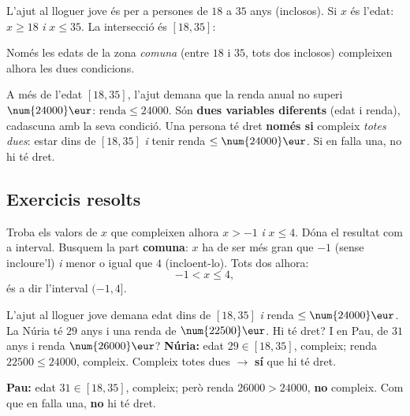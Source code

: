 \begin{exemple}
L'ajut al lloguer jove és per a persones de $18$ a $35$ anys (inclosos). Si $x$ és
l'edat: $x\ge 18$ \emph{i} $x\le 35$. La intersecció és $[18,35]$:

\begin{center}
\end{center}

\noindent Només les edats de la zona \emph{comuna} (entre $18$ i $35$, tots dos
inclosos) compleixen alhora les dues condicions.
\end{exemple}

\begin{exemple}
A més de l'edat $[18,35]$, l'ajut demana que la renda anual no superi $\num{24000}\eur$:
$\text{renda}\le\num{24000}$. Són \textbf{dues variables diferents} (edat i renda),
cadascuna amb la seva condició. Una persona té dret \textbf{només si} compleix
\emph{totes dues}: estar dins de $[18,35]$ \emph{i} tenir renda $\le\num{24000}\eur$.
Si en falla una, no hi té dret.
\end{exemple}

\subsection{Exercicis resolts}

\begin{exresolt}
Troba els valors de $x$ que compleixen alhora $x>-1$ \emph{i} $x\le 4$. Dóna el
resultat com a interval.
\solucio
Busquem la part \textbf{comuna}: $x$ ha de ser més gran que $-1$ (sense incloure'l)
\emph{i} menor o igual que $4$ (incloent-lo). Tots dos alhora:
\[
-1<x\le 4,
\]
és a dir l'interval $(-1,4]$.
\resposta{$(-1,4]$.}
\end{exresolt}

\begin{exresolt}
L'ajut al lloguer jove demana edat dins de $[18,35]$ \emph{i} renda $\le\num{24000}\eur$.
La Núria té $29$ anys i una renda de $\num{22500}\eur$. Hi té dret? I en Pau, de
$31$ anys i renda $\num{26000}\eur$?
\solucio
\textbf{Núria:} edat $29\in[18,35]$, compleix; renda $\num{22500}\le\num{24000}$,
compleix. Compleix totes dues $\rightarrow$ \textbf{sí} que hi té dret.

\textbf{Pau:} edat $31\in[18,35]$, compleix; però renda
$\num{26000}>\num{24000}$, \textbf{no} compleix. Com que en falla una, \textbf{no}
hi té dret.
\end{exresolt}

